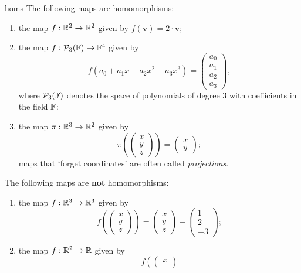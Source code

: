 \begin{example}{}{homs}
 The following maps are homomorphisms:
 \begin{enumerate}[label=(\alph*)]
  \item the map $f:\mathbb{R}^2 \to \mathbb{R}^2$ given by $f(\mathbf{v}) = 2 \cdot \mathbf{v}$;
  \item the map $f:\mathcal{P}_3(\mathbb{F}) \to \mathbb{F}^{4}$ given by
   \[
    f(a_0 + a_1x + a_2x^2 + a_3x^3) = 
    \begin{pmatrix}
     a_0\\
     a_1\\
     a_2\\
     a_3
    \end{pmatrix},
   \]
   where $\mathcal{P}_3(\mathbb{F})$ denotes the space of polynomials of degree $3$ with
   coefficients in the field $\mathbb{F}$;
  \item the map $\pi: \mathbb{R}^3 \to \mathbb{R}^2$ given by
   \[
    \pi \left( 
    \begin{pmatrix}
     x\\
     y\\
     z
    \end{pmatrix}
    \right) = 
    \begin{pmatrix}
     x\\
     y
    \end{pmatrix};
   \]
   maps that `forget coordinates' are often called \emph{projections}.
 \end{enumerate}
 The following maps are \textbf{not} homomorphisms:
 \begin{enumerate}[label=(\alph*)]
  \item the map $f:\mathbb{R}^3 \to \mathbb{R}^3$ given by
   \[
    f \left( 
    \begin{pmatrix}
     x\\
     y\\
     z
    \end{pmatrix}
    \right) = 
    \begin{pmatrix}
     x\\
     y\\
     z
    \end{pmatrix}
    +
    \begin{pmatrix}
     1\\
     2\\
     -3
    \end{pmatrix};
   \]
  \item the map $f: \mathbb{R}^2 \to \mathbb{R}$ given by
   \[
    f \left( 
    \begin{pmatrix}
     x\\

\end{pmatrix}\]
\end{enumerate}
\end{example}
